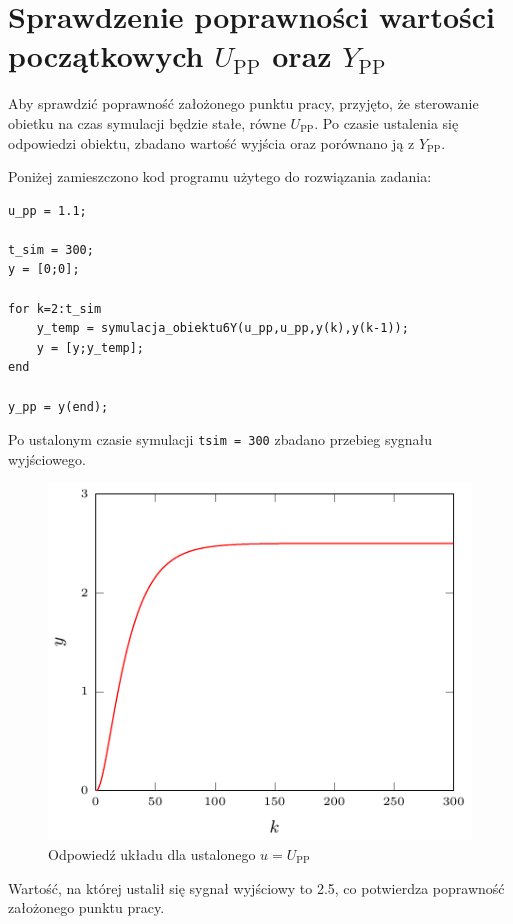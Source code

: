 \chapter{Sprawdzenie poprawności wartości początkowych $U_{\textrm{PP}}$ oraz $Y_{\textrm{PP}}$}

Aby sprawdzić poprawność założonego punktu pracy, przyjęto, że sterowanie obietku na czas symulacji będzie stałe, równe $U_{\textrm{PP}}$. Po czasie ustalenia się odpowiedzi obiektu, zbadano wartość wyjścia oraz porównano ją z $Y_{\textrm{PP}}$.

\par Poniżej zamieszczono kod programu użytego do rozwiązania zadania:
\begin{lstlisting}[style=Matlab-editor]
%wyznaczanie y_pp dla u_pp = 1.1
u_pp = 1.1;

t_sim = 300;
y = [0;0];

for k=2:t_sim
    y_temp = symulacja_obiektu6Y(u_pp,u_pp,y(k),y(k-1));
    y = [y;y_temp];
end

y_pp = y(end);
\end{lstlisting}

Po ustalonym czasie symulacji \texttt{t\textunderscore sim = 300} zbadano przebieg sygnału wyjściowego.

\begin{figure}[h] 
\centering 
\includegraphics[scale=1.4]{wykresy/zad1_2/1_1.pdf} 
\caption{Odpowiedź układu dla ustalonego $u = U_{\textrm{PP}}$} 
\end{figure}

Wartość, na której ustalił się sygnał wyjściowy to \num{2.5}, co potwierdza poprawność założonego punktu pracy.